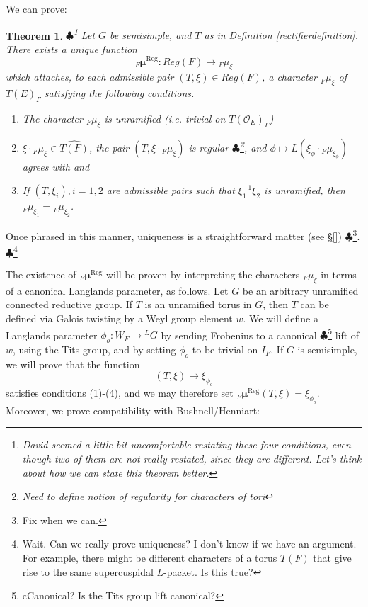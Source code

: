 \documentclass[11pt]{amsart}
\theoremstyle{plain}
\newtheorem{theorem}{Theorem}[section]
\newcommand{\MAxxx}[1]{$\clubsuit$\footnote{#1}}
\theoremstyle{definition}
\begin{document}
We can prove:

\begin{theorem}\label{regularrectifierdefinition}\MAxxx{David seemed a little bit
uncomfortable restating these four conditions, even though two of them are not
really restated, since they are different.  Let's think about how we can
 state this theorem better.}
Let $G$ be semisimple, and $T$ as in Definition \ref{rectifierdefinition}.
There exists a unique function $${}_F
  \boldsymbol\mu^{\mathrm{Reg}} : Reg(F) \mapsto {}_F \mu_{\xi}$$ which attaches,
  to each admissible pair $(T, \xi) \in Reg(F)$, a character ${}_F
  \mu_{\xi}$ of $T(E)_{\Gamma}$ satisfying the following conditions.

\begin{enumerate}
\item The character ${}_F \mu_{\xi}$ is unramified (i.e. trivial on
  $T(\mathcal{O}_E)_{\Gamma}$)

\item $\xi \cdot {}_F \mu_{\xi} \in \widehat{T(F)}$, the pair
$(T, \xi \cdot {}_F \mu_{\xi})$ is regular \MAxxx{Need to define notion of
regularity for characters of tori}, and
$\phi \mapsto L(\xi_{\phi} \cdot {}_F \mu_{\xi_{\phi}})$
  agrees with \cite{debackerreeder} and \cite{reeder}

\item If $(T, \xi_i), i = 1,2$ are admissible pairs  such that
$\xi_1^{-1} \xi_2$ is unramified, then
${}_F \mu_{\xi_1} = {}_F \mu_{\xi_2}$.
\end{enumerate}
\end{theorem}

Once phrased in this manner, uniqueness is a straightforward matter
(see \S\ref{}) \MAxxx{Fix when we can.}. \MAxxx{Wait.  Can we really prove uniqueness?
I don't know if we have an argument.  For example, there might be different
characters of a torus $T(F)$ that give rise to the same supercuspidal $L$-packet.
Is this true?}

The existence of ${}_F  \boldsymbol\mu^{\mathrm{Reg}}$
will be proven by interpreting the characters ${}_F \mu_{\xi}$
in terms of a canonical Langlands parameter, as follows.  Let
$G$ be an arbitrary unramified connected reductive group.  If
$T$ is an unramified torus in $G$, then $T$ can be defined
via Galois twisting by a Weyl group element $w$.  We will define
a Langlands parameter $\phi_o :W _F \rightarrow {}^L G$ by
sending Frobenius to a canonical \MAxxx{cCanonical?  Is the Tits group
lift canonical?} lift of $w$, using the Tits group, and by setting
$\phi_o$ to be trivial on $I_F$.
If $G$ is semisimple,
we will prove that the function $$(T, \xi) \mapsto \xi_{\phi_o}$$
satisfies conditions (1)-(4), and we may therefore set
${}_F \boldsymbol\mu^{\mathrm{Reg}}(T,\xi) = \xi_{\phi_o}$.
Moreover, we prove compatibility with Bushnell/Henniart:
\end{document}

